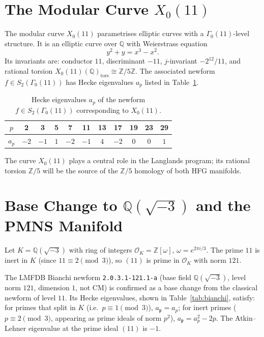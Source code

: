 \documentclass[11pt,a4paper]{article}
\theoremstyle{definition}
\newcommand{\QQ}{\mathbb{Q}}
\newcommand{\ZZ}{\mathbb{Z}}
\begin{document}
\section{The Modular Curve $X_0(11)$}
\label{sec:X011}

The modular curve $X_0(11)$ parametrises elliptic curves with a
$\Gamma_0(11)$-level structure.
It is an elliptic curve over $\QQ$ with Weierstrass equation
\[
y^2 + y = x^3 - x^2.
\]
Its invariants are: conductor $11$, discriminant $-11$,
$j$-invariant $-2^{12}/11$, and rational torsion
$X_0(11)(\QQ)_{\mathrm{tors}} \cong \ZZ/5\ZZ$.
The associated newform $f \in S_2(\Gamma_0(11))$ has Hecke
eigenvalues $a_p$ listed in Table~\ref{tab:ap}.

\begin{table}[htbp]
\centering
\caption{Hecke eigenvalues $a_p$ of the newform
$f \in S_2(\Gamma_0(11))$ corresponding to $X_0(11)$.}
\label{tab:ap}
\begin{tabular}{c|cccccccccc}
$p$ & 2 & 3 & 5 & 7 & 11 & 13 & 17 & 19 & 23 & 29 \\
\hline
$a_p$ & $-2$ & $-1$ & $1$ & $-2$ & $-1$ & $4$
      & $-2$ & $0$ & $0$ & $1$
\end{tabular}
\end{table}

The curve $X_0(11)$ plays a central role in the Langlands program;
its rational torsion $\ZZ/5$ will be the source of the $\ZZ/5$
homology of both HFG manifolds.

\section{Base Change to $\QQ(\sqrt{-3})$ and the PMNS Manifold}
\label{sec:bianchi}

Let $K = \QQ(\sqrt{-3})$ with ring of integers
$\mathcal{O}_K = \ZZ[\omega]$, $\omega = e^{2\pi i/3}$.
The prime $11$ is inert in $K$ (since $11 \equiv 2 \pmod{3}$),
so $(11)$ is prime in $\mathcal{O}_K$ with norm $121$.

The LMFDB Bianchi newform \texttt{2.0.3.1-121.1-a}
(base field $\QQ(\sqrt{-3})$, level norm $121$, dimension $1$,
not CM) is confirmed as a base change from the classical newform
of level $11$.
Its Hecke eigenvalues, shown in Table~\ref{tab:bianchi}, satisfy:
for primes that split in $K$ (i.e.\ $p \equiv 1 \pmod{3}$),
$a_{\mathfrak{p}} = a_p$; for inert primes
($p \equiv 2 \pmod{3}$, appearing as prime ideals of norm $p^2$),
$a_{\mathfrak{p}} = a_p^2 - 2p$.
The Atkin--Lehner eigenvalue at the prime ideal $(11)$ is $-1$.
\end{document}
